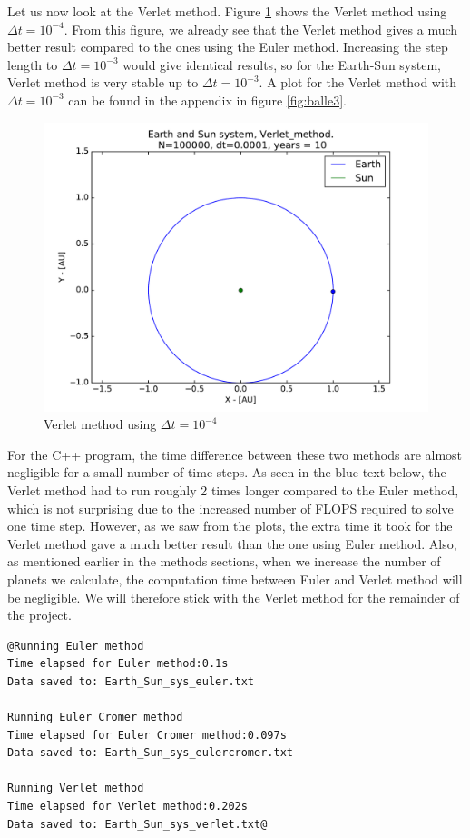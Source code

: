 \documentclass[12pt]{article}
\begin{document}
Let us now look at the Verlet method. Figure \ref{fig:balle2} shows the Verlet method using $\Delta t = 10^{-4}$. From this figure, we already see that the Verlet method gives a much better result compared to the ones using the Euler method. Increasing the step length to $\Delta t = 10^{-3}$ would give identical results, so for the Earth-Sun system, Verlet method is very stable up to $\Delta t = 10^{-3}$. A plot for the Verlet method with $\Delta t = 10^{-3}$ can be found in the appendix in figure \ref{fig:balle3}.

\begin{figure}[!h]
\centering
\includegraphics[width=\linewidth]{Plots/Earth_Sun_Verlet_method.pdf}
\caption{Verlet method using $\Delta t = 10^{-4}$}
\label{fig:balle2}
\end{figure}

For the C++ program, the time difference between these two methods are almost negligible for a small number of time steps. As seen in the blue text below, the Verlet method had to run roughly 2 times longer compared to the Euler method, which is not surprising due to the increased number of FLOPS required to solve one time step. However, as we saw from the plots, the extra time it took for the Verlet method gave a much better result than the one using Euler method. Also, as mentioned earlier in the methods sections, when we increase the number of planets we calculate, the computation time between Euler and Verlet method will be negligible. We will therefore stick with the Verlet method for the remainder of the project. 

\begin{lstlisting}
@Running Euler method
Time elapsed for Euler method:0.1s
Data saved to: Earth_Sun_sys_euler.txt

Running Euler Cromer method
Time elapsed for Euler Cromer method:0.097s
Data saved to: Earth_Sun_sys_eulercromer.txt

Running Verlet method
Time elapsed for Verlet method:0.202s
Data saved to: Earth_Sun_sys_verlet.txt@
\end{lstlisting}
\end{document}
